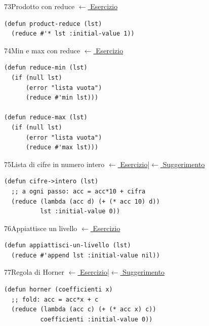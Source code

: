 \label{sol:73}
\begin{solbox}{73}{Prodotto con reduce}
\small\color{black!55}\hyperref[ex:73]{$\leftarrow$ Esercizio}\normalsize\color{black}
\begin{lstlisting}
(defun product-reduce (lst)
  (reduce #'* lst :initial-value 1))
\end{lstlisting}
\end{solbox}

\label{sol:74}
\begin{solbox}{74}{Min e max con reduce}
\small\color{black!55}\hyperref[ex:74]{$\leftarrow$ Esercizio}\normalsize\color{black}
\begin{lstlisting}
(defun reduce-min (lst)
  (if (null lst)
      (error "lista vuota")
      (reduce #'min lst)))

(defun reduce-max (lst)
  (if (null lst)
      (error "lista vuota")
      (reduce #'max lst)))
\end{lstlisting}
\end{solbox}

\label{sol:75}
\begin{solbox}{75}{Lista di cifre in numero intero}
\small\color{black!55}\hyperref[ex:75]{$\leftarrow$ Esercizio}\enspace\textcolor{black!30}{|}\enspace\hyperref[hint:75]{$\leftarrow$ Suggerimento}\normalsize\color{black}
\begin{lstlisting}
(defun cifre->intero (lst)
  ;; a ogni passo: acc = acc*10 + cifra
  (reduce (lambda (acc d) (+ (* acc 10) d))
          lst :initial-value 0))
\end{lstlisting}
\end{solbox}

\label{sol:76}
\begin{solbox}{76}{Appiattisce un livello}
\small\color{black!55}\hyperref[ex:76]{$\leftarrow$ Esercizio}\normalsize\color{black}
\begin{lstlisting}
(defun appiattisci-un-livello (lst)
  (reduce #'append lst :initial-value nil))
\end{lstlisting}
\end{solbox}

\label{sol:77}
\begin{solbox}{77}{Regola di Horner}
\small\color{black!55}\hyperref[ex:77]{$\leftarrow$ Esercizio}\enspace\textcolor{black!30}{|}\enspace\hyperref[hint:77]{$\leftarrow$ Suggerimento}\normalsize\color{black}
\begin{lstlisting}
(defun horner (coefficienti x)
  ;; fold: acc = acc*x + c
  (reduce (lambda (acc c) (+ (* acc x) c))
          coefficienti :initial-value 0))
\end{lstlisting}
\end{solbox}


